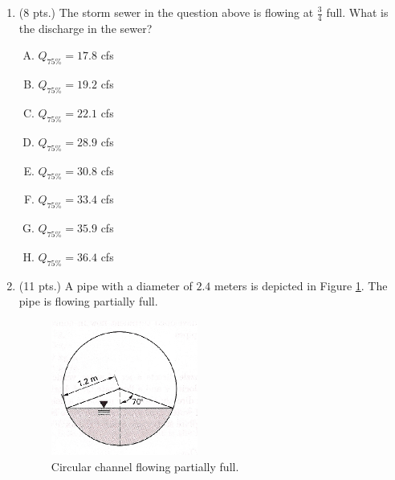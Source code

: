 \documentclass[11pt]{article}
\begin{document}
\begin{enumerate}
\begin{enumerate} [(A)]
\item  $17.8$ cfs
\item  $19.2$ cfs
\item  $22.1$ cfs
\item  $28.9$ cfs
\item  $31.2$ cfs
\item  $33.4$ cfs
\item  $35.9$ cfs
\item  $36.4$ cfs
\end{enumerate}


\clearpage
\item (8 pts.)
The storm sewer in the question above is flowing at $\frac{3}{4}$ full.  What is the discharge in the sewer?
\begin{enumerate} [(A)]
\item  $Q_{75\%}= 17.8$ cfs
\item  $Q_{75\%}=19.2$ cfs
\item  $Q_{75\%}=22.1$ cfs
\item  $Q_{75\%}=28.9$ cfs
\item  $Q_{75\%}=30.8$ cfs
\item  $Q_{75\%}=33.4$ cfs
\item  $Q_{75\%}=35.9$ cfs
\item  $Q_{75\%}=36.4$ cfs
\end{enumerate}
\item  (11 pts.)
A pipe with a diameter of $2.4$ meters is depicted in Figure \ref{fig:CircularSewerToo}.   The pipe is flowing partially full.

\begin{figure}[h!] %
\centering
   \includegraphics[width=1.9in]{CircularSewerToo.jpg}
   \caption{Circular channel flowing partially full.}
   \label{fig:CircularSewerToo} 
\end{figure}


\end{enumerate}
\end{document}
